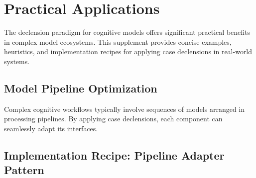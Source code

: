 \documentclass[
  11pt,
  letterpaper,
]{article}
\begin{document}
\hypertarget{practical-applications}{%
\section{Practical Applications}\label{practical-applications}}

The declension paradigm for cognitive models offers significant
practical benefits in complex model ecosystems. This supplement provides
concise examples, heuristics, and implementation recipes for applying
case declensions in real-world systems.

\hypertarget{model-pipeline-optimization}{%
\subsection{Model Pipeline
Optimization}\label{model-pipeline-optimization}}

Complex cognitive workflows typically involve sequences of models
arranged in processing pipelines. By applying case declensions, each
component can seamlessly adapt its interfaces.

\hypertarget{implementation-recipe-pipeline-adapter-pattern}{%
\subsection{Implementation Recipe: Pipeline Adapter
Pattern}\label{implementation-recipe-pipeline-adapter-pattern}}
\end{document}
